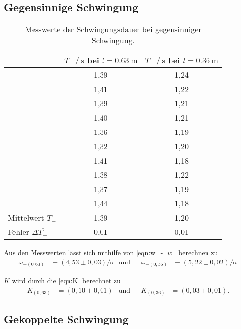 \subsection{Gegensinnige Schwingung}
\label{subsec:aus_gegen}
\begin{table}[H]
  \centering
  \caption{Messwerte der Schwingungsdauer bei gegensinniger Schwingung.}
  \label{tab:T-}
  \begin{tabular}{l S S}
    \toprule
     & {$T_- \mathbin{/} \si{\second}$ bei $l=\qty{0.63}{\meter}$} & {$T_- \mathbin{/} \si{\second}$ bei $l=\qty{0.36}{\meter}$}\\
    \midrule
      &1,39 & 1,24\\
      &1,41 & 1,22\\
      &1,39 & 1,21\\
      &1,40 & 1,21\\
      &1,36 & 1,19\\
      &1,32 & 1,20\\
      &1,41 & 1,18\\
      &1,38 & 1,22\\
      &1,37 & 1,19\\
      &1,44 & 1,18\\
    \midrule
      Mittelwert $\overline{T_-}$& 1,39 & 1,20\\
      Fehler $\Delta \overline{T_-}$& 0,01 & 0,01\\
    \bottomrule
  \end{tabular}
\end{table}

Aus den Messwerten lässt sich mithilfe von \autoref{eqn:w_-} $w_-$ berechnen zu 
\begin{align*}
  \omega_{-(0,63)}&=(4,53 \pm 0,03) \si{\per\second} & \text{und} && \omega_{-(0,36)}&=(5,22 \pm 0,02) \si{\per\second}.
\end{align*}

$K$ wird durch die \autoref{eqn:K} berechnet zu
\begin{align*}
  K_{(0,63)}&=(0,10 \pm 0,01) & \text{und} && K_{(0,36)}&=(0,03 \pm 0,01).
\end{align*} 

\subsection{Gekoppelte Schwingung}
\label{subsec:aus_gekoppelt}

